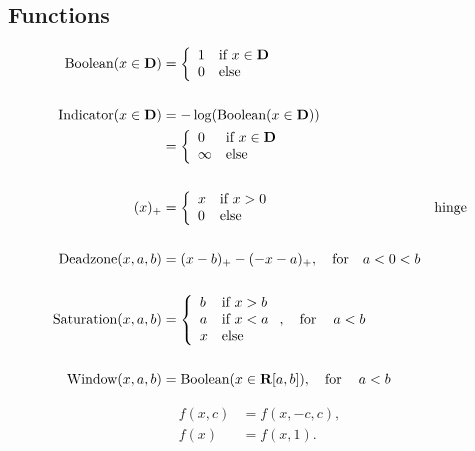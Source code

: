 \documentclass{article}
\begin{document}
\subsection{Functions}
    \begin{align*}
        \text{Boolean}(x\in\textbf{D})
        &=\left\{
            \begin{array}{lllllllllllllllllll}
            1&\text{if $x\in\textbf{D}$} \\ 
            0&\text{else}
            \end{array}\right.
            &&\text{}
            \\\\
        \text{Indicator}(x\in\textbf{D})&=-\log(\text{Boolean}(x\in\textbf{D}))\\
        &=\left\{
            \begin{array}{lllllllllllllllllll}
            0&\text{if $x\in\textbf{D}$} \\ 
            \infty&\text{else}
            \end{array}\right.
            &&\text{}\\\\
        (x)_+&=\left\{
            \begin{array}{lllllllllllllllllll}
            x&\text{if $x>0$} \\ 
            0&\text{else}
            \end{array}\right.&&\text{hinge}
        \\\\
        \text{Deadzone}(x,a,b)&=(x-b)_+-(-x-a)_+,\quad\text{for}\quad a<0<b
        &&\text{}
        \\\\
        \text{Saturation}(x,a,b)&=
        \left\{
            \begin{array}{lllllllllllllllllll}
                b&\text{if $x>b$} \\ 
        a&\text{if $x<a$} \\
        x & \text{else}\end{array}\right.,\quad\text{for}\quad\:a<b
        &&\text{}
        \\\\
        \text{Window}(x,a,b)&=
        \text{Boolean}(x\in\textbf{R}[a,b]),
                \quad\text{for}\quad\:a<b
        &&\text{}
    \end{align*} 


    \begin{align*}
        f(x,c)&=f(x,-c,c),\\
        f(x)&=f(x,1).
    \end{align*}   
\end{document}
